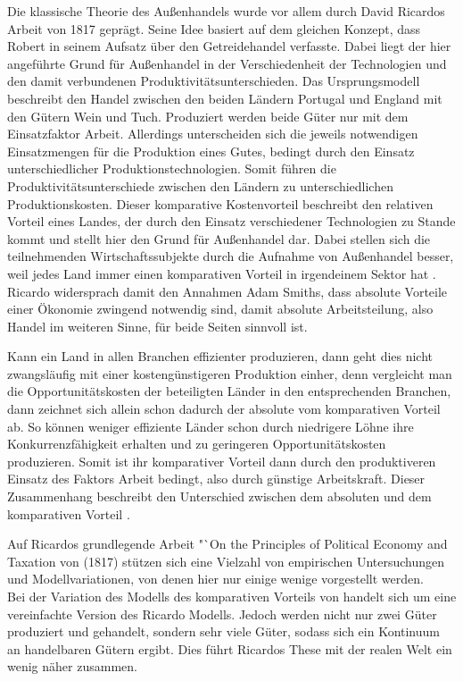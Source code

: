 Die klassische Theorie des Au{\ss}enhandels wurde vor allem durch David Ricardos Arbeit von 1817 gepr{\"a}gt. Seine Idee basiert auf dem gleichen Konzept, dass Robert \citet{Torrens.1815} in seinem Aufsatz {\"u}ber den Getreidehandel verfasste. Dabei liegt der hier angef{\"u}hrte Grund f{\"u}r Au{\ss}enhandel in der Verschiedenheit der Technologien und den damit verbundenen Produktivit{\"a}tsunterschieden. Das Ursprungsmodell beschreibt den Handel zwischen den beiden L{\"a}ndern Portugal und England mit den G{\"u}tern Wein und Tuch. Produziert werden beide G{\"u}ter nur mit dem Einsatzfaktor Arbeit.  Allerdings unterscheiden sich die jeweils notwendigen Einsatzmengen f{\"u}r die Produktion eines Gutes, bedingt durch den Einsatz unterschiedlicher Produktionstechnologien. Somit f{\"u}hren die Produktivit{\"a}tsunterschiede zwischen den L{\"a}ndern zu unterschiedlichen Produktionskosten. Dieser komparative Kostenvorteil beschreibt den relativen Vorteil eines Landes, der durch den Einsatz verschiedener Technologien zu Stande kommt und stellt hier den Grund f{\"u}r Au{\ss}enhandel dar. Dabei stellen sich die teilnehmenden Wirtschaftssubjekte durch die Aufnahme von Au{\ss}enhandel besser, weil jedes Land immer einen komparativen Vorteil in irgendeinem Sektor hat \citep{Ricardo.1817}. \newline Ricardo widersprach damit den Annahmen Adam Smiths, dass absolute Vorteile einer {\"O}konomie zwingend notwendig sind, damit absolute Arbeitsteilung, also Handel im weiteren Sinne, f{\"u}r beide Seiten sinnvoll ist.\newline


Kann ein Land in allen Branchen effizienter produzieren, dann geht dies nicht zwangsl{\"a}ufig mit einer kosteng{\"u}nstigeren Produktion einher, denn vergleicht man die Opportunit{\"a}tskosten der beteiligten L{\"a}nder in den entsprechenden Branchen, dann zeichnet sich allein schon dadurch der absolute vom komparativen Vorteil ab. So können weniger effiziente L{\"a}nder schon durch niedrigere L{\"o}hne ihre Konkurrenzf{\"a}higkeit erhalten und zu geringeren Opportunit{\"a}tskosten produzieren. Somit ist ihr komparativer Vorteil dann durch den produktiveren Einsatz des Faktors Arbeit bedingt, also durch g{\"u}nstige Arbeitskraft. Dieser Zusammenhang beschreibt den Unterschied zwischen dem absoluten und dem komparativen Vorteil \citep{Ricardo.1817}.\newline


Auf Ricardos grundlegende Arbeit "`On the Principles of Political Economy and Taxation{\dq} von  (1817) st{\"u}tzen sich eine Vielzahl von empirischen Untersuchungen und Modellvariationen, von denen hier nur einige wenige vorgestellt werden.\\
Bei der Variation des Modells des komparativen Vorteils von \citet{Dornbusch.1977} handelt sich um eine vereinfachte Version des Ricardo Modells. Jedoch werden nicht nur zwei G{\"u}ter produziert und gehandelt, sondern sehr viele G{\"u}ter, sodass sich ein Kontinuum an handelbaren G{\"u}tern ergibt. Dies f{\"u}hrt Ricardos These mit der realen Welt ein wenig n{\"a}her zusammen.\\



